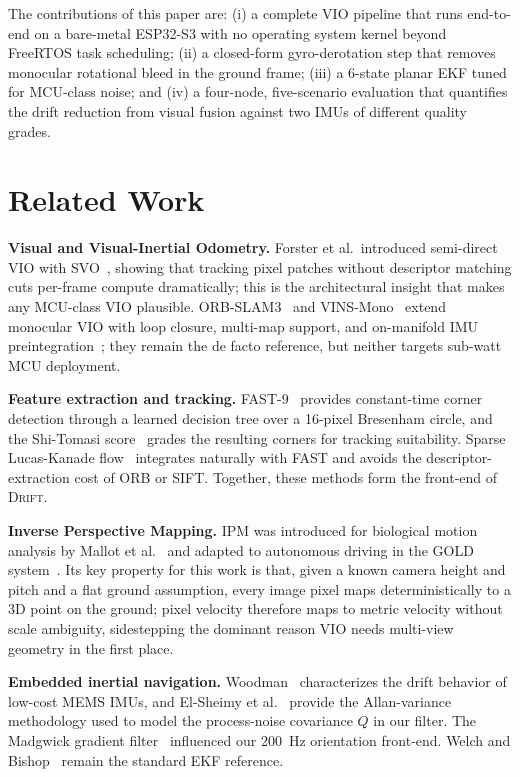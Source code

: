 \documentclass[conference]{IEEEtran}
\begin{document}
The contributions of this paper are: (i) a complete VIO pipeline
that runs end-to-end on a bare-metal ESP32-S3 with no operating
system kernel beyond FreeRTOS task scheduling; (ii) a closed-form
gyro-derotation step that removes monocular rotational bleed in the
ground frame; (iii) a 6-state planar EKF tuned for MCU-class noise;
and (iv) a four-node, five-scenario evaluation that quantifies the
drift reduction from visual fusion against two IMUs of different
quality grades.

\section{Related Work}
\label{sec:related}

\textbf{Visual and Visual-Inertial Odometry.}
Forster et al.\ introduced semi-direct VIO with SVO~\cite{forster2014svo},
showing that tracking pixel patches without descriptor matching cuts
per-frame compute dramatically; this is the architectural insight that
makes any MCU-class VIO plausible.  ORB-SLAM3~\cite{campos2021orbslam3}
and VINS-Mono~\cite{qin2018vinsmono} extend monocular VIO with
loop closure, multi-map support, and on-manifold IMU
preintegration~\cite{forster2017preintegration}; they remain the de
facto reference, but neither targets sub-watt MCU deployment.

\textbf{Feature extraction and tracking.}
FAST-9~\cite{rosten2010fast} provides constant-time corner detection
through a learned decision tree over a 16-pixel Bresenham circle, and
the Shi-Tomasi score~\cite{shi1994good} grades the resulting corners
for tracking suitability.  Sparse Lucas-Kanade
flow~\cite{lucas1981kanade,bouguet2001pyramidal} integrates
naturally with FAST and avoids the descriptor-extraction cost of
ORB or SIFT.  Together, these methods form the front-end of
\textsc{Drift}.

\textbf{Inverse Perspective Mapping.}
IPM was introduced for biological motion analysis by
Mallot et al.~\cite{mallot1991ipm} and adapted to autonomous driving
in the GOLD system~\cite{bertozzi1998gold}.  Its key property for
this work is that, given a known camera height and pitch and a flat
ground assumption, every image pixel maps deterministically to a 3D
point on the ground; pixel velocity therefore maps to metric velocity
without scale ambiguity, sidestepping the dominant reason VIO needs
multi-view geometry in the first place.

\textbf{Embedded inertial navigation.}
Woodman~\cite{woodman2007introduction} characterizes the drift
behavior of low-cost MEMS IMUs, and El-Sheimy et al.~\cite{el-sheimy2008allan}
provide the Allan-variance methodology used to model the
process-noise covariance $Q$ in our filter.  The Madgwick gradient
filter~\cite{madgwick2011imu} influenced our 200~Hz orientation
front-end.  Welch and Bishop~\cite{welch1995kalman} remain the
standard EKF reference.
\end{document}
